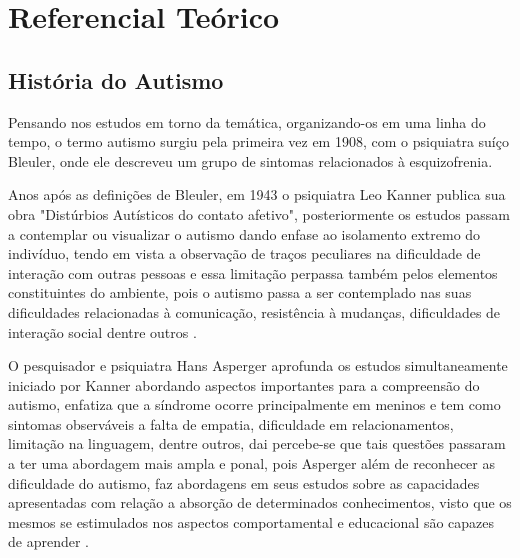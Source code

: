 

\chapter{Referencial Teórico}\label{referencial_teorico}
	
		\section{História do Autismo}
		Pensando nos estudos em torno da temática, organizando-os em uma linha do tempo, o termo autismo surgiu pela primeira vez em 1908, com o psiquiatra suíço Bleuler, onde ele descreveu um grupo de sintomas relacionados à esquizofrenia.
		
		Anos após as definições de Bleuler, em 1943 o psiquiatra Leo Kanner publica sua obra "Distúrbios Autísticos do contato afetivo", posteriormente os estudos passam a contemplar ou visualizar o autismo dando enfase ao isolamento extremo do indivíduo, tendo em vista a observação de traços peculiares na dificuldade de interação com outras pessoas e essa limitação perpassa também pelos elementos constituintes do ambiente, pois o autismo passa a ser contemplado nas suas dificuldades relacionadas à comunicação, resistência à mudanças, dificuldades de interação social dentre outros \cite{mcpartland2012autism}.
		
		O pesquisador e psiquiatra Hans Asperger aprofunda os estudos simultaneamente iniciado por Kanner abordando aspectos importantes para a compreensão do autismo, enfatiza que a síndrome ocorre principalmente em meninos e tem como sintomas observáveis a falta de empatia, dificuldade em relacionamentos, limitação na linguagem, dentre outros, dai percebe-se que tais questões passaram a ter uma abordagem mais ampla e ponal, pois Asperger além de reconhecer as dificuldade do autismo, faz abordagens em seus estudos sobre as capacidades apresentadas com relação a absorção de determinados conhecimentos, visto que os mesmos se estimulados nos aspectos comportamental e educacional são capazes de aprender \cite{mcpartland2012autism}.
		
